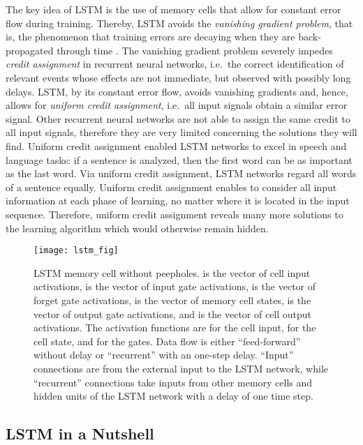 \documentclass{article}
\begin{document}
\begin{appendices}
The key idea of LSTM is the use of memory cells that allow for constant error flow
during training. Thereby, LSTM avoids the {\em vanishing gradient problem}, that is,
the phenomenon that training errors are decaying when they are back-propagated through time
\cite{Hochreiter:91,Hochreiter:00}.
The vanishing gradient problem severely impedes {\em credit assignment} in recurrent neural
networks, i.e.\ the correct identification of relevant events whose effects are not
immediate, but observed with possibly long delays.
LSTM, by its constant error flow, avoids vanishing gradients and, hence, allows for
{\em uniform credit assignment}, i.e.\ all input signals obtain a similar error signal.
Other recurrent neural networks are not able to assign the same credit to all input signals,
therefore they are very limited concerning the solutions they will
find. Uniform credit assignment enabled LSTM networks to excel in speech and
language tasks: if a sentence is analyzed, then the first word can be as important as
the last word. Via uniform credit assignment, LSTM networks regard all words of a sentence equally.
Uniform credit assignment enables to consider all input information
at each phase of learning, no matter where it is located in the input
sequence. Therefore, uniform credit assignment reveals many more
solutions to the learning algorithm which would otherwise remain hidden. 

\begin{figure}[htb]
\centering
\texttt{[image: lstm\_fig]}
\caption{LSTM memory cell without peepholes. 
 is the vector of cell input
activations,  is the vector of input gate
activations,   is the vector of forget gate
activations,   is the vector of memory cell states,
 is the vector of output gate
activations, and  is the vector of cell output 
activations. The activation functions are  for the cell input,  for the cell
state, and  for the gates. Data flow is either ``feed-forward''
without delay or ``recurrent'' with an one-step delay.
``Input'' connections are from the
external input to the LSTM network, while ``recurrent'' connections take inputs
from other memory cells and hidden units of the LSTM network with a delay of one time step.  
\label{fig:cellFB}}
\end{figure}

\subsection{LSTM in a Nutshell}


\end{appendices}
\end{document}
